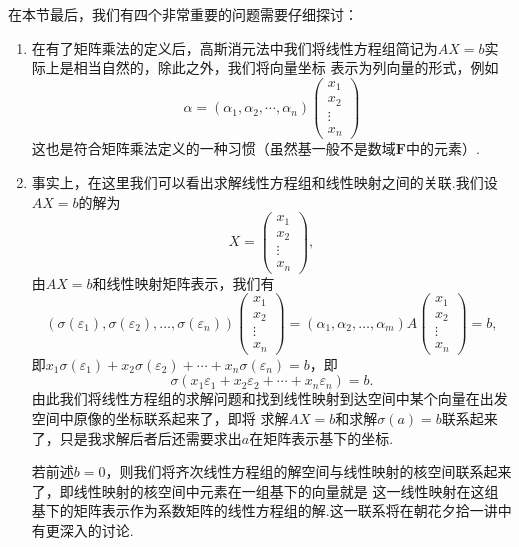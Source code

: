 在本节最后，我们有四个非常重要的问题需要仔细探讨：
\begin{enumerate}
    \item 在有了矩阵乘法的定义后，高斯消元法中我们将线性方程组简记为$AX=b$实际上是相当自然的，除此之外，我们将向量坐标
    表示为列向量的形式，例如
    \[\alpha=(\alpha_1,\alpha_2,\cdots,\alpha_n)\begin{pmatrix}
        x_1 \\ x_2 \\ \vdots \\ x_n
    \end{pmatrix}\]
    这也是符合矩阵乘法定义的一种习惯（虽然基一般不是数域$\mathbf{F}$中的元素）.

    \item 事实上，在这里我们可以看出求解线性方程组和线性映射之间的关联.我们设$AX=b$的解为
    \[X=\begin{pmatrix}
        x_1 \\ x_2 \\ \vdots \\ x_n
    \end{pmatrix},\]
    由$AX=b$和线性映射矩阵表示，我们有
    \begin{equation}\label{eq:7:方程组与核空间1}
        (\sigma(\varepsilon_1),\sigma(\varepsilon_2),\ldots,\sigma(\varepsilon_n))\begin{pmatrix}
            x_1 \\ x_2 \\ \vdots \\ x_n
        \end{pmatrix}=(\alpha_1,\alpha_2,\ldots,\alpha_m)A\begin{pmatrix}
            x_1 \\ x_2 \\ \vdots \\ x_n
        \end{pmatrix}=b,
    \end{equation}
    即$x_1\sigma(\varepsilon_1)+x_2\sigma(\varepsilon_2)+\cdots+x_n\sigma(\varepsilon_n)=b$，即
    \begin{equation}\label{eq:7:方程组与核空间2}
        \sigma(x_1\varepsilon_1+x_2\varepsilon_2+\cdots+x_n\varepsilon_n)=b.
    \end{equation}
    由此我们将线性方程组的求解问题和找到线性映射到达空间中某个向量在出发空间中原像的坐标联系起来了，即将
    求解$AX=b$和求解$\sigma(a)=b$联系起来了，只是我求解后者后还需要求出$a$在矩阵表示基下的坐标.

    若前述$b=0$，则我们将齐次线性方程组的解空间与线性映射的核空间联系起来了，即线性映射的核空间中元素在一组基下的向量就是
    这一线性映射在这组基下的矩阵表示作为系数矩阵的线性方程组的解.这一联系将在朝花夕拾一讲中有更深入的讨论.


\end{enumerate}
